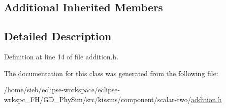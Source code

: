 \subsection*{Additional Inherited Members}


\subsection{Detailed Description}


Definition at line 14 of file addition.\-h.



The documentation for this class was generated from the following file\-:\begin{DoxyCompactItemize}
\item 
/home/sieb/eclipse-\/workspace/eclipse-\/wrkspc\-\_\-\-F\-H/\-G\-D\-\_\-\-Phy\-Sim/src/kissms/component/scalar-\/two/\hyperlink{addition_8h}{addition.\-h}\end{DoxyCompactItemize}
